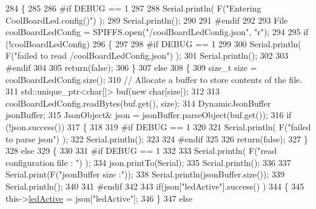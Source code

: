 \begin{DoxyCode}
284 \{
285 
286 \textcolor{preprocessor}{#if DEBUG == 1 }
287         
288     Serial.println( F(\textcolor{stringliteral}{"Entering CoolBoardLed.config()"}) );
289     Serial.println();
290 
291 \textcolor{preprocessor}{#endif}
292     
293     File coolBoardLedConfig = SPIFFS.open(\textcolor{stringliteral}{"/coolBoardLedConfig.json"}, \textcolor{stringliteral}{"r"});
294 
295     \textcolor{keywordflow}{if} (!coolBoardLedConfig) 
296     \{
297     
298 \textcolor{preprocessor}{    #if DEBUG == 1}
299 
300         Serial.println( F(\textcolor{stringliteral}{"failed to read /coolBoardLedConfig.json"}) );
301         Serial.println();
302 
303 \textcolor{preprocessor}{    #endif}
304 
305         \textcolor{keywordflow}{return}(\textcolor{keyword}{false});
306     \}
307     \textcolor{keywordflow}{else}
308     \{
309         \textcolor{keywordtype}{size\_t} size = coolBoardLedConfig.size();
310         \textcolor{comment}{// Allocate a buffer to store contents of the file.}
311         std::unique\_ptr<char[]> buf(\textcolor{keyword}{new} \textcolor{keywordtype}{char}[size]);
312 
313         coolBoardLedConfig.readBytes(buf.get(), size);
314         DynamicJsonBuffer jsonBuffer;
315         JsonObject& json = jsonBuffer.parseObject(buf.get());
316         \textcolor{keywordflow}{if} (!json.success()) 
317         \{
318         
319 \textcolor{preprocessor}{        #if DEBUG == 1}
320 
321             Serial.println( F(\textcolor{stringliteral}{"failed to parse json"}) );
322             Serial.println();
323         
324 \textcolor{preprocessor}{        #endif}
325 
326             \textcolor{keywordflow}{return}(\textcolor{keyword}{false});
327         \} 
328         \textcolor{keywordflow}{else}
329         \{
330         
331 \textcolor{preprocessor}{        #if DEBUG == 1}
332     
333             Serial.println( F(\textcolor{stringliteral}{"read configuration file : "}) );
334             json.printTo(Serial);
335             Serial.println();
336             
337             Serial.print(F(\textcolor{stringliteral}{"jsonBuffer size :"}));
338             Serial.println(jsonBuffer.size());
339             Serial.println();
340 
341 \textcolor{preprocessor}{        #endif}
342   
343             \textcolor{keywordflow}{if}(json[\textcolor{stringliteral}{"ledActive"}].success() )
344             \{
345                 this->\hyperlink{class_cool_board_led_a5f17c135516fcf4b44ea8a096ba0177a}{ledActive} = json[\textcolor{stringliteral}{"ledActive"}]; 
346             \}
347             \textcolor{keywordflow}{else}

\end{DoxyCode}
